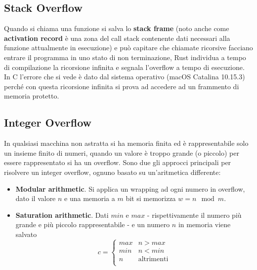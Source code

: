 \documentclass{report}
\begin{document}



\subsection{Stack Overflow}
Quando si chiama una funzione si salva lo \textbf{stack frame} (noto anche come \textbf{activation record} è una zona del call stack contenente dati necessari alla funzione attualmente in esecuzione) e può capitare che chiamate ricorsive facciano entrare il programma in uno stato di non terminazione, Rust individua a tempo di compilazione la ricorsione infinita e segnala l'overflow a tempo di esecuzione. In C l'errore che si vede è dato dal sistema operativo (macOS Catalina 10.15.3) perché con questa ricorsione infinita si prova ad accedere ad un frammento di memoria protetto.







\subsection{Integer Overflow}
In qualsiasi macchina non astratta si ha memoria finita ed è rappresentabile solo un insieme finito di numeri, quando un valore è troppo grande (o piccolo) per essere rappresentato si ha un overflow. Sono due gli approcci principali per risolvere un integer overflow, ognuno basato su un'aritmetica differente:
\begin{itemize}
    \item \textbf{Modular arithmetic}. Si applica un wrapping ad ogni numero in overflow, dato il valore $n$ e una memoria a $m$ bit si memorizza $w = n \mod m$.
    \item \textbf{Saturation arithmetic}. Dati $min$ e $max$ - rispettivamente il numero più grande e più piccolo rappresentabile - e un numero $n$ in memoria viene salvato
    \begin{equation*}
        c = \begin{cases}
            max & n > max \\
            min & n < min \\
            n  & \text{altrimenti} \\
        \end{cases}
    \end{equation*}
\end{itemize}
\end{document}
